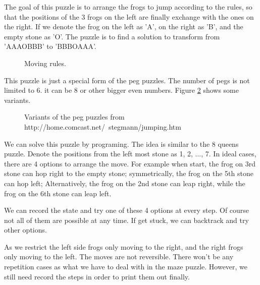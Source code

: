 \documentclass[UTF8]{article}
\begin{document}
The goal of this puzzle is to arrange the frogs to jump according to the rules, so
that the positions of the 3 frogs on the left are finally exchange with the ones on the right.
If we denote the frog on the left as 'A', on the right as 'B', and the empty stone as 'O'. The
puzzle is to find a solution to transform from 'AAAOBBB' to 'BBBOAAA'.

\begin{figure}[htbp]
 \centering
  \hspace{0.02\textwidth}
  \hspace{0.02\textwidth}
 \caption{Moving rules.}
 \label{fig:pegrules}
\end{figure}

This puzzle is just a special form of the peg puzzles. The number of pegs is not
limited to 6. it can be 8 or other bigger even numbers. Figure \ref{fig:pegpuzzles}
shows some variants.

\begin{figure}[htbp]
 \centering
  \hspace{0.02\textwidth}
  \hspace{0.02\textwidth}
 \caption{Variants of the peg puzzles from http://home.comcast.net/~stegmann/jumping.htm}
 \label{fig:pegpuzzles}
\end{figure}

We can solve this puzzle by programing. The idea is similar to the 8 queens puzzle.
Denote the positions from the left most stone as 1, 2, ..., 7.
In ideal cases, there are 4 options to arrange the move. For example when start, the frog
on 3rd stone can hop right to the empty stone; symmetrically, the frog on the 5th stone
can hop left; Alternatively, the frog on the 2nd stone can leap right, while the frog on
the 6th stone can leap left.

We can record the state and try one of these 4 options at every step. Of course not all of them
are possible at any time. If get stuck, we can backtrack and try other options.

As we restrict the left side frogs only moving to the right, and the right frogs only
moving to the left. The moves are not reversible. There won't be any repetition cases as
what we have to deal with in the maze puzzle. However, we still need record the steps
in order to print them out finally.
\end{document}
